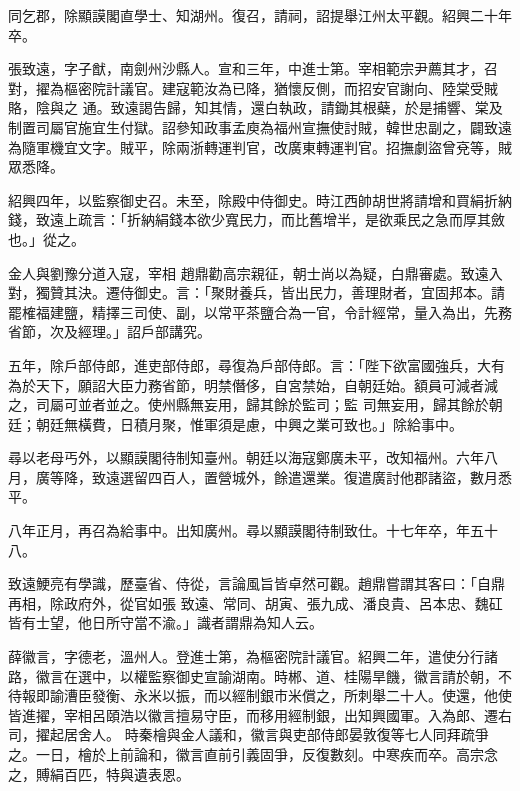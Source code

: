 \begin{pinyinscope}
 同乞郡，除顯謨閣直學士、知湖州。復召，請祠，詔提舉江州太平觀。紹興二十年卒。



 張致遠，字子猷，南劍州沙縣人。宣和三年，中進士第。宰相範宗尹薦其才，召對，擢為樞密院計議官。建寇範汝為已降，猶懷反側，而招安官謝向、陸棠受賊賂，陰與之
 通。致遠謁告歸，知其情，還白執政，請鋤其根蘗，於是捕響、棠及制置司屬官施宜生付獄。詔參知政事孟庾為福州宣撫使討賊，韓世忠副之，闢致遠為隨軍機宜文字。賊平，除兩浙轉運判官，改廣東轉運判官。招撫劇盜曾兗等，賊眾悉降。



 紹興四年，以監察御史召。未至，除殿中侍御史。時江西帥胡世將請增和買絹折納錢，致遠上疏言：「折納絹錢本欲少寬民力，而比舊增半，是欲乘民之急而厚其斂也。」從之。



 金人與劉豫分道入寇，宰相
 趙鼎勸高宗親征，朝士尚以為疑，白鼎審處。致遠入對，獨贊其決。遷侍御史。言：「聚財養兵，皆出民力，善理財者，宜固邦本。請罷榷福建鹽，精擇三司使、副，以常平茶鹽合為一官，令計經常，量入為出，先務省節，次及經理。」詔戶部講究。



 五年，除戶部侍郎，進吏部侍郎，尋復為戶部侍郎。言：「陛下欲富國強兵，大有為於天下，願詔大臣力務省節，明禁僭侈，自宮禁始，自朝廷始。額員可減者減之，司屬可並者並之。使州縣無妄用，歸其餘於監司；監
 司無妄用，歸其餘於朝廷；朝廷無橫費，日積月聚，惟軍須是慮，中興之業可致也。」除給事中。



 尋以老母丐外，以顯謨閣待制知臺州。朝廷以海寇鄭廣未平，改知福州。六年八月，廣等降，致遠選留四百人，置營城外，餘遣還業。復遣廣討他郡諸盜，數月悉平。



 八年正月，再召為給事中。出知廣州。尋以顯謨閣待制致仕。十七年卒，年五十八。



 致遠鯁亮有學識，歷臺省、侍從，言論風旨皆卓然可觀。趙鼎嘗謂其客曰：「自鼎再相，除政府外，從官如張
 致遠、常同、胡寅、張九成、潘良貴、呂本忠、魏矼皆有士望，他日所守當不渝。」識者謂鼎為知人云。



 薛徽言，字德老，溫州人。登進士第，為樞密院計議官。紹興二年，遣使分行諸路，徽言在選中，以權監察御史宣諭湖南。時郴、道、桂陽旱饑，徽言請於朝，不待報即諭漕臣發衡、永米以振，而以經制銀市米償之，所刺舉二十人。使還，他使皆進擢，宰相呂頤浩以徽言擅易守臣，而移用經制銀，出知興國軍。入為郎、遷右司，擢起居舍人。
 時秦檜與金人議和，徽言與吏部侍郎晏敦復等七人同拜疏爭之。一日，檜於上前論和，徽言直前引義固爭，反復數刻。中寒疾而卒。高宗念之，賻絹百匹，特與遺表恩。




\end{pinyinscope}
